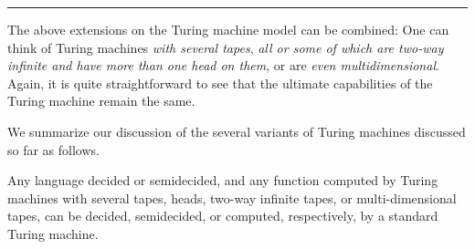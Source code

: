 \noindent\rule{\linewidth}{1pt}

The above extensions on the Turing machine model can be combined: One 
can think of Turing machines \textit{with several tapes}, \textit{all or some of which are two-way infinite and have more than one head on them}, or are \textit{even multidimensional}. Again, it is quite straightforward to see that the ultimate capabilities of the Turing machine remain the same.

We summarize our discussion of the several variants of Turing machines discussed so far as follows. 

\begin{theorem}{}
Any language decided or semidecided, and any function computed by Turing machines with several tapes, heads, two-way infinite tapes, or multi-dimensional tapes, can be decided, semidecided, or computed, respectively, by a standard Turing machine.
\end{theorem}

\vspace*{\fill}
\newpage
